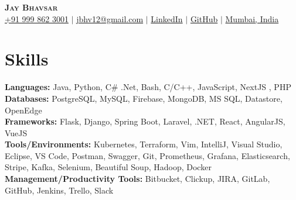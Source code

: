 \documentclass[letterpaper,11pt]{article}
\newcommand{\resumeSubHeadingListStart}{\begin{itemize}[leftmargin=0.15in, label={}]}
\newcommand{\resumeSubHeadingListEnd}{\end{itemize}}
\begin{document}

\begin{center}
    \textbf{\Huge \scshape Jay Bhavsar} \\ \vspace{3pt}
    \small
    \faMobile \hspace{.5pt} \href{tel:919998623001}{+91 999 862 3001}
    $|$
    \faAt \hspace{.5pt} \href{mailto:jbhv12@gmail.com}{jbhv12@gmail.com}
    $|$
    \faLinkedinSquare \hspace{.5pt} \href{https://www.linkedin.com/in/jbhv12/}{LinkedIn}
    $|$
    \faGithub \hspace{.5pt} \href{https://github.com/jbhv12}{GitHub}
    $|$
    \faMapMarker \hspace{.5pt} \href{https://goo.gl/maps/Czh1vXePukiKumpu5}{Mumbai, India}
\end{center}




\section{Skills}
  \vspace{2pt}
  \resumeSubHeadingListStart
    \small{\item{
        \textbf{Languages:}{ Java, Python, C\# .Net, Bash, C/C++, JavaScript, NextJS , PHP} \\ \vspace{3pt}
        \textbf{Databases:}{ PostgreSQL, MySQL, Firebase, MongoDB, MS SQL, Datastore, OpenEdge} \\ \vspace{3pt}
        \textbf{Frameworks:}{ Flask, Django, Spring Boot, Laravel, .NET, React, AngularJS, VueJS} \\ \vspace{3pt}
        \textbf{Tools/Environments:}{ Kubernetes, Terraform, Vim, IntelliJ, Visual Studio, Eclipse, VS Code, Postman, Swagger, Git, Prometheus, Grafana, Elasticsearch, Stripe, Kafka, Selenium, Beautiful Soup, Hadoop, Docker} \\ \vspace{3pt}
        \textbf{Management/Productivity Tools:}{ Bitbucket, Clickup, JIRA, GitLab, GitHub, Jenkins, Trello, Slack} \\ \vspace{3pt}
    }}
  \resumeSubHeadingListEnd
\end{document}
